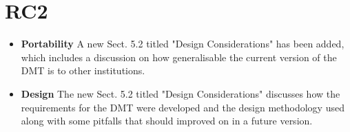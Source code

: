 \documentclass[12pt,a4paper]{article}
\begin{document}
\section{RC2}
\begin{itemize}
\item \textbf{Portability} A new Sect. 5.2 titled "Design Considerations" has been added, which includes a discussion on how generalisable the current version of the DMT is to other institutions.
	 
\item \textbf{Design} The new Sect. 5.2 titled "Design Considerations" discusses how the requirements for the DMT were developed and the design methodology used along with some pitfalls that should improved on in a future version.

\end{itemize}
\end{document}
